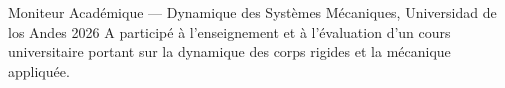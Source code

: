 \cvsection{\ExperienceLabel}

\cvexperience
{Moniteur Académique --- Dynamique des Systèmes Mécaniques, Universidad de los Andes}
{2026}
{A participé à l'enseignement et à l'évaluation d'un cours universitaire portant sur la dynamique des corps rigides et la mécanique appliquée.}
